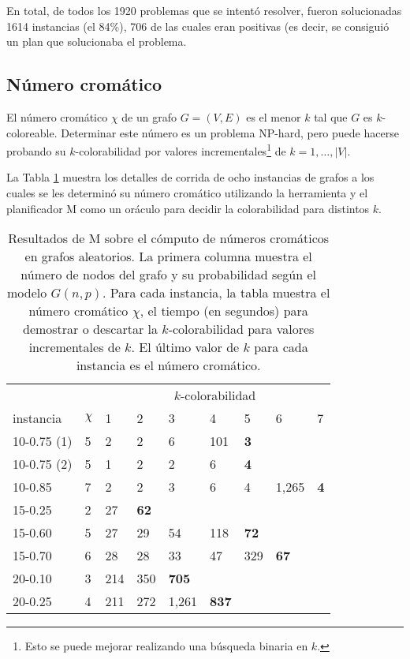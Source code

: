 En total, de todos los 1920 problemas que se intentó resolver, fueron
solucionadas 1614 instancias (el 84\%), 706 de las cuales eran positivas (es
decir, se consiguió un plan que solucionaba el problema.

\subsection{Número cromático}

El número cromático $\chi$ de un grafo $G=(V,E)$ es el menor $k$ tal que $G$ es
$k$-coloreable. Determinar este número es un problema NP-hard, pero puede
hacerse probando su $k$-colorabilidad por valores incrementales\footnote{Esto
se puede mejorar realizando una búsqueda binaria en $k$.} de
$k=1,\ldots,|V|$.

La Tabla \ref{chromatic} muestra los detalles de corrida de ocho instancias de
grafos a los cuales se les determinó su número cromático utilizando la
herramienta y el planificador M como un oráculo para decidir
la colorabilidad para distintos $k$.

\begin{table}[h!]
\centering
\small
\begin{tabular}{lllllllll}
       &       & \multicolumn{7}{c}{$k$-colorabilidad} \\
\cmidrule(l){3-9}
instancia      & $\chi$ &     1 &     2 &     3 &     4 &     5 &     6 &     7 \\
\midrule
10-0.75 (1)      &      5 &     2 &     2 &     6 &   101 &\bf  3 &       &       \\
10-0.75 (2)      &      5 &     1 &     2 &     2 &     6 &\bf  4 &       &       \\
10-0.85        &      7 &     2 &     2 &     3 &     6 &     4 & 1,265 &\bf  4 \\
15-0.25        &      2 &    27 &\bf 62 &       &       &       &       &       \\
15-0.60        &      5 &    27 &    29 &    54 &   118 &\bf 72 &       &       \\
15-0.70        &      6 &    28 &    28 &    33 &    47 &   329 &\bf 67 &       \\
20-0.10        &      3 &   214 &   350 &\bf705 &       &       &       &       \\ %
20-0.25        &      4 &   211 &   272 & 1,261 &\bf837 &       &       &       \\
\midrule
\end{tabular}
\caption[Resultados de M sobre números cromáticos]{
Resultados de M sobre el cómputo de números cromáticos en grafos aleatorios.
La primera columna muestra el número de nodos del grafo y su probabilidad según
el modelo $G(n,p)$.
Para cada instancia, la tabla muestra el número cromático $\chi$, el tiempo
(en segundos) para demostrar o descartar la $k$-colorabilidad para valores
incrementales de $k$.
El último valor de $k$ para cada instancia es el número cromático.}
\label{chromatic}
\end{table}

